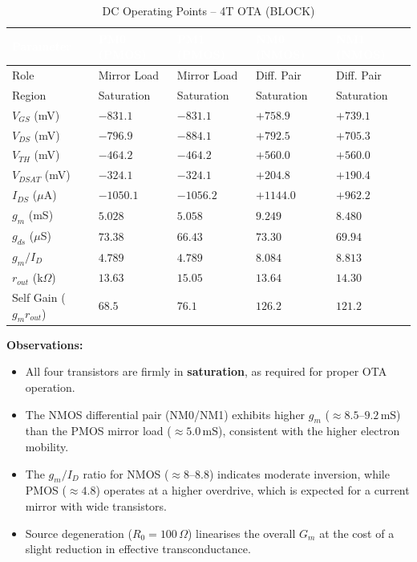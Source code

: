 \documentclass[12pt,a4paper]{article}
\begin{document}
\begin{table}[H]
  \centering
  \caption{DC Operating Points -- 4T OTA (BLOCK)}
  \renewcommand{\arraystretch}{1.4}
  \begin{tabularx}{\textwidth}{lXXXX}
    \toprule
    \rowcolor{headerblue}
    \textcolor{white}{\textbf{Parameter}}
      & \textcolor{white}{\textbf{PM0 (PMOS)}}
      & \textcolor{white}{\textbf{PM1 (PMOS)}}
      & \textcolor{white}{\textbf{NM0 (NMOS)}}
      & \textcolor{white}{\textbf{NM1 (NMOS)}} \\
    \midrule
    \rowcolor{rowgray}
    Role              & Mirror Load & Mirror Load & Diff. Pair & Diff. Pair \\
    Region            & Saturation  & Saturation  & Saturation & Saturation \\
    \rowcolor{rowgray}
    $V_{GS}$ (mV)    & $-831.1$    & $-831.1$    & $+758.9$   & $+739.1$   \\
    $V_{DS}$ (mV)    & $-796.9$    & $-884.1$    & $+792.5$   & $+705.3$   \\
    \rowcolor{rowgray}
    $V_{TH}$ (mV)    & $-464.2$    & $-464.2$    & $+560.0$   & $+560.0$   \\
    $V_{DSAT}$ (mV)  & $-324.1$    & $-324.1$    & $+204.8$   & $+190.4$   \\
    \rowcolor{rowgray}
    $I_{DS}$ ($\mu$A) & $-1050.1$ & $-1056.2$   & $+1144.0$  & $+962.2$   \\
    $g_m$ (mS)       & $5.028$     & $5.058$     & $9.249$    & $8.480$    \\
    \rowcolor{rowgray}
    $g_{ds}$ ($\mu$S) & $73.38$   & $66.43$     & $73.30$    & $69.94$    \\
    $g_m/I_D$        & $4.789$     & $4.789$     & $8.084$    & $8.813$    \\
    \rowcolor{rowgray}
    $r_{out}$ (k$\Omega$) & $13.63$ & $15.05$  & $13.64$    & $14.30$    \\
    Self Gain ($g_m r_{out}$) & $68.5$ & $76.1$ & $126.2$   & $121.2$    \\
    \bottomrule
  \end{tabularx}
\end{table}

\textbf{Observations:}
\begin{itemize}[leftmargin=1.5em]
  \item All four transistors are firmly in \textbf{saturation}, as required for proper OTA operation.
  \item The NMOS differential pair (NM0/NM1) exhibits higher $g_m$ ($\approx 8.5$--$9.2\,\text{mS}$)
        than the PMOS mirror load ($\approx 5.0\,\text{mS}$), consistent with the
        higher electron mobility.
  \item The $g_m/I_D$ ratio for NMOS ($\approx 8$--$8.8$) indicates moderate inversion, while
        PMOS ($\approx 4.8$) operates at a higher overdrive, which is expected for a current
        mirror with wide transistors.
  \item Source degeneration ($R_0 = 100\,\Omega$) linearises the overall $G_m$ at the cost of
        a slight reduction in effective transconductance.
\end{itemize}
\end{document}
